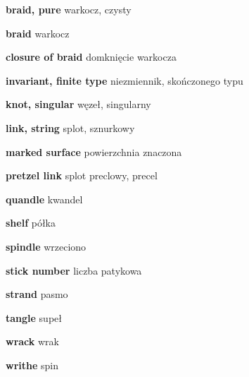 \item \textbf{braid, pure} warkocz, czysty
\item \textbf{braid} warkocz
\item \textbf{closure of braid} domknięcie warkocza
\item \textbf{invariant, finite type} niezmiennik, skończonego typu
\item \textbf{knot, singular} węzeł, singularny
\item \textbf{link, string} splot, sznurkowy
\item \textbf{marked surface} powierzchnia znaczona
\item \textbf{pretzel link} splot preclowy, precel
\item \textbf{quandle} kwandel
\item \textbf{shelf} półka
\item \textbf{spindle} wrzeciono
\item \textbf{stick number} liczba patykowa
\item \textbf{strand} pasmo
\item \textbf{tangle} supeł
\item \textbf{wrack} wrak
\item \textbf{writhe} spin

